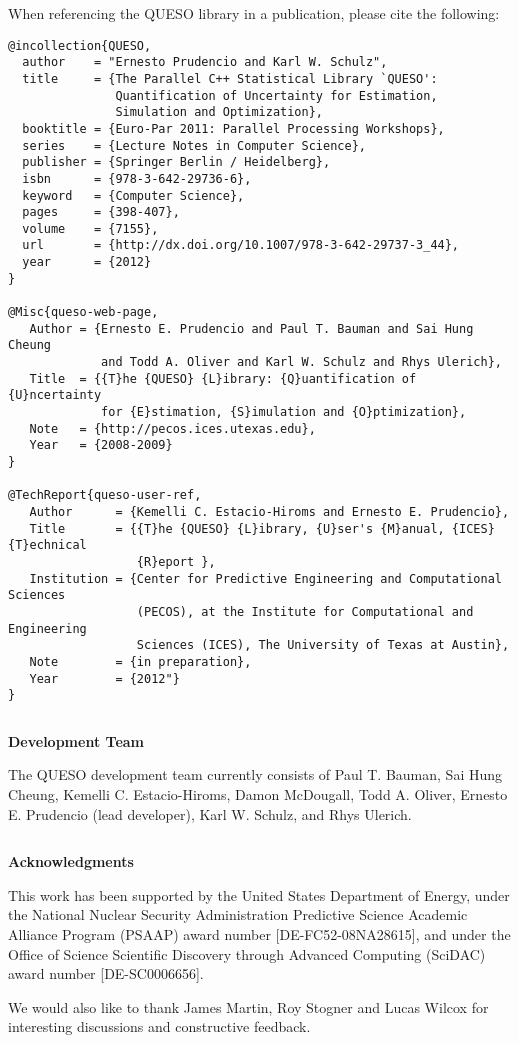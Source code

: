 When referencing the QUESO library in a publication, please cite the following:
\begin{verbatim}
@incollection{QUESO,
  author    = "Ernesto Prudencio and Karl W. Schulz",
  title     = {The Parallel C++ Statistical Library `QUESO':
               Quantification of Uncertainty for Estimation,
               Simulation and Optimization},
  booktitle = {Euro-Par 2011: Parallel Processing Workshops},
  series    = {Lecture Notes in Computer Science},
  publisher = {Springer Berlin / Heidelberg},
  isbn      = {978-3-642-29736-6},
  keyword   = {Computer Science},
  pages     = {398-407},
  volume    = {7155},
  url       = {http://dx.doi.org/10.1007/978-3-642-29737-3_44},
  year      = {2012}
}

@Misc{queso-web-page,
   Author = {Ernesto E. Prudencio and Paul T. Bauman and Sai Hung Cheung
             and Todd A. Oliver and Karl W. Schulz and Rhys Ulerich},
   Title  = {{T}he {QUESO} {L}ibrary: {Q}uantification of {U}ncertainty
             for {E}stimation, {S}imulation and {O}ptimization},
   Note   = {http://pecos.ices.utexas.edu},
   Year   = {2008-2009}
}

@TechReport{queso-user-ref,
   Author      = {Kemelli C. Estacio-Hiroms and Ernesto E. Prudencio},
   Title       = {{T}he {QUESO} {L}ibrary, {U}ser's {M}anual, {ICES} {T}echnical
                  {R}eport },
   Institution = {Center for Predictive Engineering and Computational Sciences
                  (PECOS), at the Institute for Computational and Engineering
                  Sciences (ICES), The University of Texas at Austin},
   Note        = {in preparation},
   Year        = {2012"}
}
\end{verbatim}
$~$\\
$~$\\


\centerline{\bf \Queso{} Development Team}
The QUESO development team currently consists of
Paul T. Bauman,
Sai Hung Cheung,
Kemelli C. Estacio-Hiroms,
Damon McDougall,
Todd A. Oliver,
Ernesto E. Prudencio (lead developer),
Karl W. Schulz, and
Rhys Ulerich.

$~$\\
$~$\\

\centerline{\bf Acknowledgments}

This work has been supported by the United States Department of Energy,
under the National Nuclear Security Administration Predictive Science Academic Alliance Program (PSAAP) award number [DE-FC52-08NA28615], and
under the Office of Science Scientific Discovery through Advanced Computing (SciDAC) award number [DE-SC0006656].


We would also like to thank
James Martin,
Roy Stogner and
Lucas Wilcox
for interesting discussions and constructive feedback.

